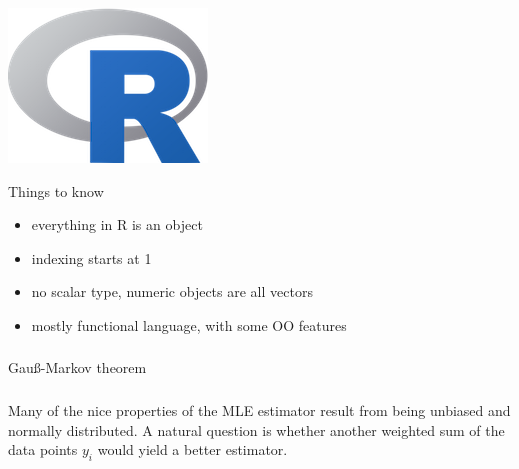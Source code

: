 \begin{frame}[fragile] \frametitle{}

\noindent
\begin{minipage}{0.5\textwidth}
\includegraphics[width=0.75\linewidth]{img/Rlogo.png}
\end{minipage}%
\begin{minipage}{0.5\textwidth}
Things to know \\
\begin{itemize}
\item everything in R is an object
\item indexing starts at 1
\item no scalar type, numeric objects are all vectors
\item mostly functional language, with some OO features
\end{itemize}
\end{minipage}

\end{frame}

\begin{frame}[fragile] \frametitle{}

\begin{flushright}
{\color{yaleblue}\sc\fontsize{1cm}{0cm}\selectfont Gauß-Markov theorem}
\end{flushright}

\end{frame}

\begin{frame}[fragile] \frametitle{}

Many of the nice properties of the MLE estimator result from being
unbiased and normally distributed. A natural question is whether
another weighted sum of the data points $y_i$ would yield a better
estimator.

\end{frame}

